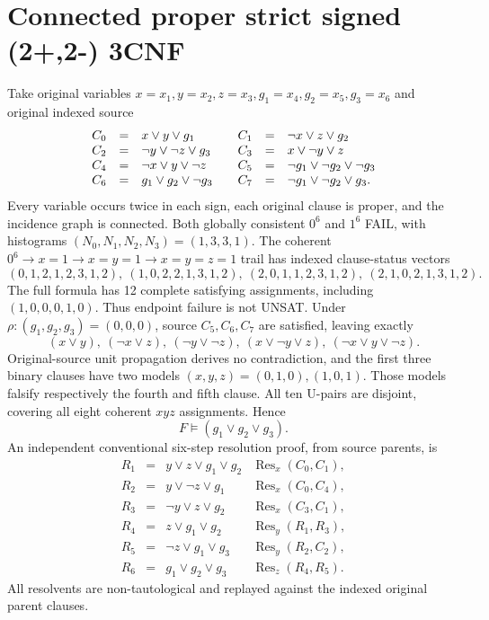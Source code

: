 \documentclass{article}
\begin{document}
\section{Connected proper strict signed (2+,2-) 3CNF}
Take original variables $x=x_1,y=x_2,z=x_3,g_1=x_4,g_2=x_5,g_3=x_6$ and original indexed source
\[
\begin{array}{rcl@{\qquad}rcl}
C_0&=&x\vee y\vee g_1&C_1&=&\neg x\vee z\vee g_2\\
C_2&=&\neg y\vee\neg z\vee g_3&C_3&=&x\vee\neg y\vee z\\
C_4&=&\neg x\vee y\vee\neg z&C_5&=&\neg g_1\vee\neg g_2\vee\neg g_3\\
C_6&=&g_1\vee g_2\vee\neg g_3&C_7&=&\neg g_1\vee\neg g_2\vee g_3.
\end{array}
\]
Every variable occurs twice in each sign, each original clause is proper, and the incidence graph is connected. Both globally consistent $0^6$ and $1^6$ FAIL, with histograms $(N_0,N_1,N_2,N_3)=(1,3,3,1)$. The coherent $0^6\to x=1\to x=y=1\to x=y=z=1$ trail has indexed clause-status vectors
\[
(0,1,2,1,2,3,1,2),\ (1,0,2,2,1,3,1,2),\
(2,0,1,1,2,3,1,2),\ (2,1,0,2,1,3,1,2).
\]
The full formula has 12 complete satisfying assignments, including $(1,0,0,0,1,0)$. Thus endpoint failure is not UNSAT.
Under $\rho:(g_1,g_2,g_3)=(0,0,0)$, source $C_5,C_6,C_7$ are satisfied, leaving exactly
\[
(x\vee y),\ (\neg x\vee z),\ (\neg y\vee\neg z),\
(x\vee\neg y\vee z),\ (\neg x\vee y\vee\neg z).
\]
Original-source unit propagation derives no contradiction, and the first three binary clauses have two models $(x,y,z)=(0,1,0),(1,0,1)$. Those models falsify respectively the fourth and fifth clause. All ten U-pairs are disjoint, covering all eight coherent $xyz$ assignments. Hence
\[
\boxed{F\models(g_1\vee g_2\vee g_3)}.
\]
An independent conventional six-step resolution proof, from source parents, is
\[
\begin{array}{rcll}
R_1&=&y\vee z\vee g_1\vee g_2&\operatorname{Res}_x(C_0,C_1),\\
R_2&=&y\vee\neg z\vee g_1&\operatorname{Res}_x(C_0,C_4),\\
R_3&=&\neg y\vee z\vee g_2&\operatorname{Res}_x(C_3,C_1),\\
R_4&=&z\vee g_1\vee g_2&\operatorname{Res}_y(R_1,R_3),\\
R_5&=&\neg z\vee g_1\vee g_3&\operatorname{Res}_y(R_2,C_2),\\
R_6&=&g_1\vee g_2\vee g_3&\operatorname{Res}_z(R_4,R_5).
\end{array}
\]
All resolvents are non-tautological and replayed against the indexed original parent clauses.
\end{document}

